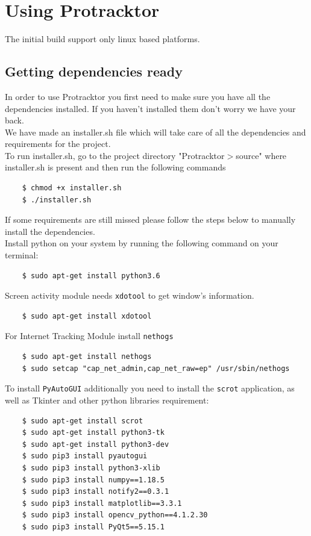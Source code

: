\documentclass{article}
\begin{document}

\section{Using Protracktor}
The initial build support only linux based platforms.
\subsection{Getting dependencies ready}
In order to use Protracktor you first need to make sure you have all the dependencies installed. If you haven't installed them don't worry we have your back.\\
We have made an installer.sh file which will take care of all the dependencies and requirements for the project.\\
To run installer.sh, go to the project directory "Protracktor$>$source" where installer.sh is present and then run the following commands\\
\begin{verbatim}
    $ chmod +x installer.sh
    $ ./installer.sh
\end{verbatim}

If some requirements are still missed please follow the steps below to manually install the dependencies.\\
Install python on your system by running the following command on your terminal:
\begin{verbatim}
    $ sudo apt-get install python3.6
\end{verbatim}
Screen activity module needs \verb|xdotool| to get window's information.
\begin{verbatim}
    $ sudo apt-get install xdotool
\end{verbatim}
For Internet Tracking Module install \verb|nethogs| 
\begin{verbatim}
    $ sudo apt-get install nethogs
    $ sudo setcap "cap_net_admin,cap_net_raw=ep" /usr/sbin/nethogs
\end{verbatim}
To install \verb|PyAutoGUI| additionally you need to install the \verb|scrot| application, as well as Tkinter and other python libraries requirement: 
\begin{verbatim}
    $ sudo apt-get install scrot
    $ sudo apt-get install python3-tk
    $ sudo apt-get install python3-dev
    $ sudo pip3 install pyautogui
    $ sudo pip3 install python3-xlib
    $ sudo pip3 install numpy==1.18.5
    $ sudo pip3 install notify2==0.3.1
    $ sudo pip3 install matplotlib==3.3.1
    $ sudo pip3 install opencv_python==4.1.2.30
    $ sudo pip3 install PyQt5==5.15.1
\end{verbatim}
\end{document}
